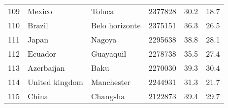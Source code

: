 \begin{center}
\begin{longtable}{clllcc}
        109                                      & Mexico                               & Toluca                            & 2377828                                 & 30.2                                  & 18.7                                  \\
        110                                      & Brazil                               & Belo horizonte                    & 2375151                                 & 36.3                                  & 26.5                                  \\
        111                                      & Japan                                & Nagoya                            & 2295638                                 & 38.8                                  & 28.1                                  \\
        112                                      & Ecuador                              & Guayaquil                         & 2278738                                 & 35.5                                  & 27.4                                  \\
        113                                      & Azerbaijan                           & Baku                              & 2270030                                 & 39.3                                  & 30.4                                  \\
        114                                      & United kingdom                       & Manchester                        & 2244931                                 & 31.3                                  & 21.7                                  \\
        115                                      & China                                & Changsha                          & 2122873                                 & 39.4                                  & 29.7                                  \\
    \end{longtable}
\end{center}
